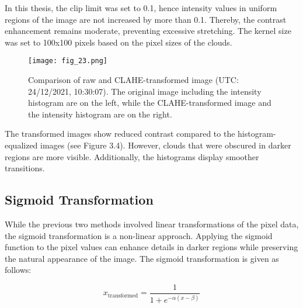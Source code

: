 In this thesis, the clip limit was set to 0.1, hence intensity values in uniform regions of the image are not increased by more than 0.1. Thereby, the contrast enhancement remains moderate, preventing excessive stretching. The kernel size was set to 100x100 pixels based on the pixel sizes of the clouds.
\FloatBarrier
\begin{figure}[h!] 
    \centering
    \texttt{[image: fig\_23.png]}
    \caption{Comparison of raw and CLAHE-transformed image (UTC: 24/12/2021, 10:30:07). The original image including the intensity histogram are on the left, while the CLAHE-transformed image and the intensity histogram are on the right.}
\end{figure}
\FloatBarrier
The transformed images show reduced contrast compared to the histogram-equalized images (see Figure 3.4). However, clouds that were obscured in darker regions are more visible. Additionally, the histograms display smoother transitions.

\subsection{Sigmoid Transformation}

While the previous two methods involved linear transformations of the pixel data, the sigmoid transformation is a non-linear approach. Applying the sigmoid function to the pixel values can enhance details in darker regions while preserving the natural appearance of the image. The sigmoid transformation is given as follows\cite{Braun2000}: 

\begin{equation}
x_{\text{transformed}} = \frac{1}{1 + e^{-\alpha (x - \beta)}}
\end{equation}

